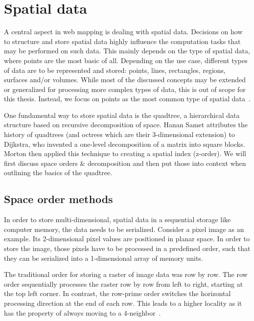 
%
%

\section{Spatial data}
\label{chapter:spatial-data}

A central aspect in web mapping is dealing with spatial data. Decisions on how to structure and store spatial data highly influence the computation tasks that may be performed on such data. This mainly depends on the type of spatial data, where points are the most basic of all. Depending on the use case, different types of data are to be represented and stored: points, lines, rectangles, regions, surfaces and/or volumes. While most of the discussed concepts may be extended or generalized for processing more complex types of data, this is out of scope for this thesis. Instead, we focus on points as the most common type of spatial data~\cite{Samet90spatialdata}.

One fundamental way to store spatial data is the quadtree, a hierarchical data structure based on recursive decomposition of space. Hanan Samet attributes the history of quadtrees (and octrees which are their 3-dimensional extension) to Dijkstra, who invented a one-level decomposition of a matrix into square blocks. Morton then applied this technique to creating a spatial index (z-order). We will first discuss space orders \& decomposition and then put those into context when outlining the basics of the quadtree.


\subsection{Space order methods}
\label{chapter:space-order}

In order to store multi-dimensional, spatial data in a sequential storage like computer memory, the data needs to be serialized. Consider a pixel image as an example. Its 2-dimensional pixel values are positioned in planar space. In order to store the image, those pixels have to be processed in a predefined order, such that they can be serialized into a 1-dimensional array of memory units.

The traditional order for storing a raster of image data was row by row. The row order sequentially processes the raster row by row from left to right, starting at the top left corner. In contrast, the row-prime order switches the horizontal processing direction at the end of each row. This leads to a higher locality as it has the property of always moving to a 4-neighbor~\cite{Goodchild83raster}.

